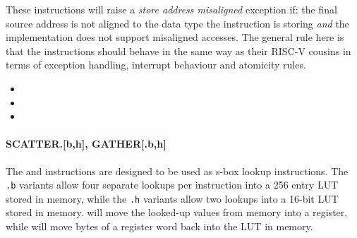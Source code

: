 These instructions will raise a {\em store address misaligned} exception
if: the final source address is not aligned to the data type the instruction
is storing {\em and} the implementation does not support misaligned accesses.
The general rule here is that the  instructions should behave in
the same way as their RISC-V cousins in terms of exception handling,
interrupt behaviour and atomicity rules.

\begin{itemize}
\item {}
\item {}
\item {}
\end{itemize}


\paragraph{SCATTER.[b,h], GATHER[.b,h]}

The  and  instructions are designed to be used as
s-box lookup instructions. The {\tt .b} variants allow four separate lookups
per instruction into a 256 entry LUT stored in memory, while the {\tt .h}
variants allow two lookups into a 16-bit LUT stored in memory. 
will move the looked-up values from memory into a register, while 
will move bytes of a register word back into the LUT in memory.

